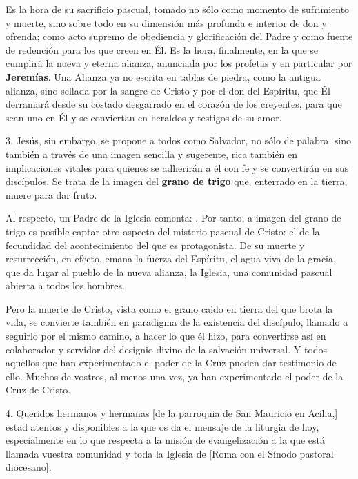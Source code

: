 \begin{body}
Es la hora de su sacrificio pascual, tomado no sólo como momento de sufrimiento y muerte, sino sobre todo en su dimensión más profunda e interior de don y ofrenda; como acto supremo de obediencia y glorificación del Padre y como fuente de redención para los que creen en Él. Es la hora, finalmente, en la que se cumplirá la nueva y eterna alianza, anunciada por los profetas y en particular por \textbf{Jeremías}. Una Alianza ya no escrita en tablas de piedra, como la antigua alianza, sino sellada por la sangre de Cristo y por el don del Espíritu, que Él derramará desde su costado desgarrado en el corazón de los creyentes, para que sean uno en Él y se conviertan en heraldos y testigos de su amor.

3. Jesús, sin embargo, se propone a todos como Salvador, no sólo de palabra, sino también a través de una imagen sencilla y sugerente, rica también en implicaciones vitales para quienes se adherirán a él con fe y se convertirán en sus discípulos. Se trata de la imagen del \textbf{grano de trigo} que, enterrado en la tierra, muere para dar fruto.

Al respecto, un Padre de la Iglesia comenta: . Por tanto, a imagen del grano de trigo es posible captar otro aspecto del misterio pascual de Cristo: el de la fecundidad del acontecimiento del que es protagonista. De su muerte y resurrección, en efecto, emana la fuerza del Espíritu, el agua viva de la gracia, que da lugar al pueblo de la nueva alianza, la Iglesia, una comunidad pascual abierta a todos los hombres.

Pero la muerte de Cristo, vista como el grano caido en tierra del que brota la vida, se convierte también en paradigma de la existencia del discípulo, llamado a seguirlo por el mismo camino, a hacer lo que él hizo, para convertirse así en colaborador y servidor del designio divino de la salvación universal. Y todos aquellos que han experimentado el poder de la Cruz pueden dar testimonio de ello. Muchos de vostros, al menos una vez, ya han experimentado el poder de la Cruz de Cristo.

4. Queridos hermanos y hermanas [de la parroquia de San Mauricio en Acilia,] estad atentos y disponibles a la  que os da el mensaje de la liturgia de hoy, especialmente en lo que respecta a la misión de evangelización a la que está llamada vuestra comunidad y toda la Iglesia de [Roma con el Sínodo pastoral diocesano].


\end{body}
